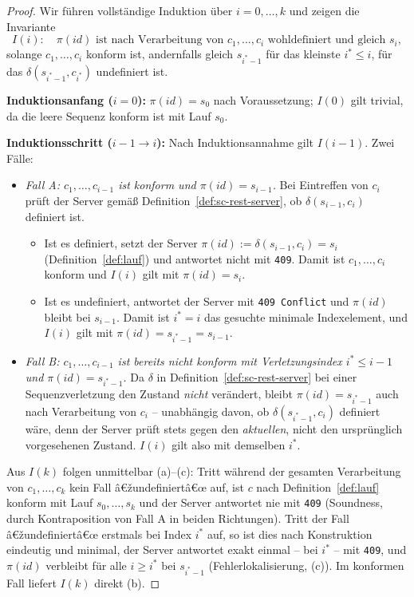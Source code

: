 ﻿\documentclass[a4paper,12pt]{article}
\theoremstyle{definition}
\begin{document}
\begin{proof}
	Wir führen vollständige Induktion über $i=0,\ldots,k$ und zeigen die Invariante
	\[
		I(i):\quad \pi(id) \text{ ist nach Verarbeitung von } c_1,\ldots,c_i
		\text{ wohldefiniert und gleich } s_i,
	\]
	solange $c_1,\ldots,c_i$ konform ist, andernfalls gleich $s_{i^\ast-1}$ für das
	kleinste $i^\ast \le i$, für das $\delta(s_{i^\ast-1},c_{i^\ast})$ undefiniert ist.

	\textbf{Induktionsanfang ($i=0$):} $\pi(id)=s_0$ nach Voraussetzung; $I(0)$ gilt
	trivial, da die leere Sequenz konform ist mit Lauf $s_0$.

	\textbf{Induktionsschritt ($i-1 \to i$):} Nach Induktionsannahme gilt $I(i-1)$.
	Zwei Fälle:
	\begin{itemize}
		\item \emph{Fall A: $c_1,\ldots,c_{i-1}$ ist konform und $\pi(id)=s_{i-1}$.}
		      Bei Eintreffen von $c_i$ prüft der Server gemäß
		      Definition~\ref{def:sc-rest-server}, ob $\delta(s_{i-1},c_i)$ definiert ist.
		      \begin{itemize}
			      \item Ist es definiert, setzt der Server $\pi(id):=\delta(s_{i-1},c_i)=s_i$
			            (Definition~\ref{def:lauf}) und antwortet nicht mit \texttt{409}.
			            Damit ist $c_1,\ldots,c_i$ konform und $I(i)$ gilt mit $\pi(id)=s_i$.
			      \item Ist es undefiniert, antwortet der Server mit \texttt{409 Conflict}
			            und $\pi(id)$ bleibt bei $s_{i-1}$. Damit ist $i^\ast = i$ das
			            gesuchte minimale Indexelement, und $I(i)$ gilt mit
			            $\pi(id)=s_{i^\ast-1}=s_{i-1}$.
		      \end{itemize}
		\item \emph{Fall B: $c_1,\ldots,c_{i-1}$ ist bereits nicht konform mit
		      Verletzungsindex $i^\ast \le i-1$ und $\pi(id)=s_{i^\ast-1}$.} Da $\delta$ in
		      Definition~\ref{def:sc-rest-server} bei einer Sequenzverletzung den Zustand
		      \emph{nicht} verändert, bleibt $\pi(id)=s_{i^\ast-1}$ auch nach Verarbeitung
		      von $c_i$ -- unabhängig davon, ob $\delta(s_{i^\ast-1},c_i)$ definiert wäre,
		      denn der Server prüft stets gegen den \emph{aktuellen}, nicht den
		      ursprünglich vorgesehenen Zustand. $I(i)$ gilt also mit demselben $i^\ast$.
	\end{itemize}

	Aus $I(k)$ folgen unmittelbar (a)--(c): Tritt während der gesamten Verarbeitung von
	$c_1,\ldots,c_k$ kein Fall â€žundefiniertâ€œ auf, ist $c$ nach Definition~\ref{def:lauf}
	konform mit Lauf $s_0,\ldots,s_k$ und der Server antwortet nie mit \texttt{409}
	(Soundness, durch Kontraposition von Fall A in beiden Richtungen).
	Tritt der Fall â€žundefiniertâ€œ erstmals bei Index $i^\ast$ auf, so ist dies nach
	Konstruktion eindeutig und minimal, der Server antwortet exakt einmal -- bei
	$i^\ast$ -- mit \texttt{409}, und $\pi(id)$ verbleibt für alle $i \ge i^\ast$ bei
	$s_{i^\ast-1}$ (Fehlerlokalisierung, (c)). Im konformen Fall liefert $I(k)$ direkt
	(b). \qedhere
\end{proof}
\end{document}
